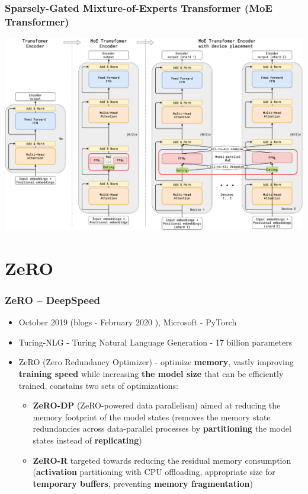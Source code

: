 \documentclass{beamer}
\begin{document}
\begin{frame}
    \frametitle{Sparsely-Gated Mixture-of-Experts Transformer (MoE Transformer)}
    \begin{center}
        \includegraphics[scale=0.25]{img/gshard_architecture.png}
    \end{center}
\end{frame}




\section{ZeRO}
\begin{frame}
    \frametitle{ZeRO \cite{zero} -- DeepSpeed}
    \begin{itemize}
        \item October 2019 (blogs - February 2020 \cite{blog_turing_nlg}), Microsoft - PyTorch
        \item Turing-NLG - Turing Natural Language Generation - 17 billion parameters
        \item ZeRO (Zero Redundancy Optimizer) - optimize \textbf{memory}, vastly improving \textbf{training speed} while increasing \textbf{the model size} that can be efficiently trained, constains two sets of optimizations:
        \begin{itemize}
            \item \textbf{ZeRO-DP} (ZeRO-powered data parallelism) aimed at reducing the memory footprint of the model states (removes the memory state redundancies across data-parallel processes by \textbf{partitioning} the model states instead of \textbf{replicating})
            \item \textbf{ZeRO-R} targeted towards reducing the residual memory consumption (\textbf{activation} partitioning
with CPU offloading, appropriate size for \textbf{temporary buffers}, preventing \textbf{memory fragmentation})
        \end{itemize}
    \end{itemize}
\end{frame}
\end{document}
